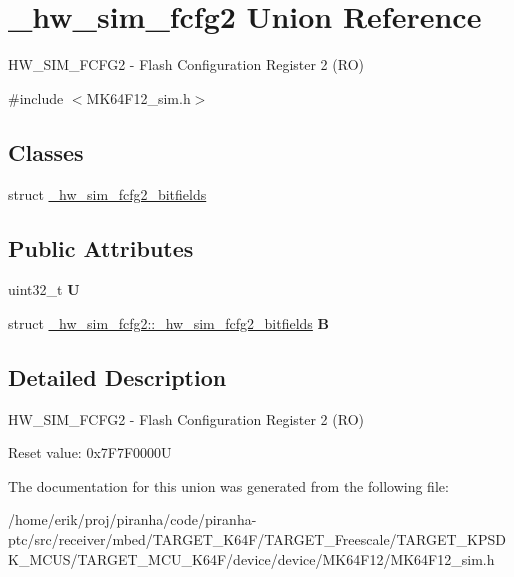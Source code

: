 \hypertarget{union__hw__sim__fcfg2}{}\section{\+\_\+hw\+\_\+sim\+\_\+fcfg2 Union Reference}
\label{union__hw__sim__fcfg2}


H\+W\+\_\+\+S\+I\+M\+\_\+\+F\+C\+F\+G2 -\/ Flash Configuration Register 2 (RO)  




{\ttfamily \#include $<$M\+K64\+F12\+\_\+sim.\+h$>$}

\subsection*{Classes}
\begin{DoxyCompactItemize}
\item 
struct \hyperlink{struct__hw__sim__fcfg2_1_1__hw__sim__fcfg2__bitfields}{\+\_\+hw\+\_\+sim\+\_\+fcfg2\+\_\+bitfields}
\end{DoxyCompactItemize}
\subsection*{Public Attributes}
\begin{DoxyCompactItemize}
\item 
uint32\+\_\+t {\bfseries U}\hypertarget{union__hw__sim__fcfg2_af31dca4df4d86ddda6eeacc582d3f624}{}\label{union__hw__sim__fcfg2_af31dca4df4d86ddda6eeacc582d3f624}

\item 
struct \hyperlink{struct__hw__sim__fcfg2_1_1__hw__sim__fcfg2__bitfields}{\+\_\+hw\+\_\+sim\+\_\+fcfg2\+::\+\_\+hw\+\_\+sim\+\_\+fcfg2\+\_\+bitfields} {\bfseries B}\hypertarget{union__hw__sim__fcfg2_a4a5ee3321fa71b9176c35ca4e509d6b5}{}\label{union__hw__sim__fcfg2_a4a5ee3321fa71b9176c35ca4e509d6b5}

\end{DoxyCompactItemize}


\subsection{Detailed Description}
H\+W\+\_\+\+S\+I\+M\+\_\+\+F\+C\+F\+G2 -\/ Flash Configuration Register 2 (RO) 

Reset value\+: 0x7\+F7\+F0000U 

The documentation for this union was generated from the following file\+:\begin{DoxyCompactItemize}
\item 
/home/erik/proj/piranha/code/piranha-\/ptc/src/receiver/mbed/\+T\+A\+R\+G\+E\+T\+\_\+\+K64\+F/\+T\+A\+R\+G\+E\+T\+\_\+\+Freescale/\+T\+A\+R\+G\+E\+T\+\_\+\+K\+P\+S\+D\+K\+\_\+\+M\+C\+U\+S/\+T\+A\+R\+G\+E\+T\+\_\+\+M\+C\+U\+\_\+\+K64\+F/device/device/\+M\+K64\+F12/M\+K64\+F12\+\_\+sim.\+h\end{DoxyCompactItemize}

